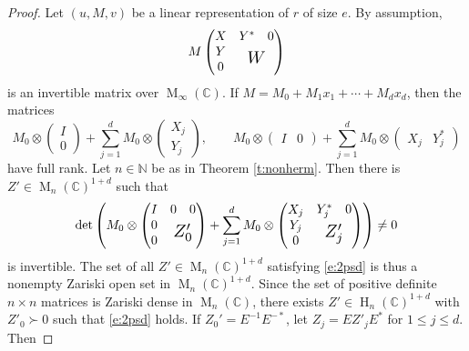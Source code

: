 \documentclass[12pt,a4paper]{amsart}
\DeclareMathOperator{\opm}{M}
\DeclareMathOperator{\oph}{H}
\newcommand{\N}{\mathbb{N}}
\newcommand{\C}{\mathbb{C}}
\newcommand*{\mathlarger}[1]{\scalebox{1.35}{$#1$}}
\newcommand*{\mat}[1]{\opm_{#1}(\C)}
\newcommand*{\her}[1]{\oph_{#1}(\C)}
\newcommand{\cfm}{\opm_\infty(\C)}
\theoremstyle{definition}
\theoremstyle{remark}
\numberwithin{equation}{section}
\begin{document}
\begin{proof}
Let $(u,M,v)$ be a linear representation of $r$ of size $e$.
By assumption,
$$M\begin{pmatrix}
X & \begin{matrix} Y^* & 0\end{matrix} \\
\begin{matrix} Y \\ 0\end{matrix} & \mathlarger{W}
\end{pmatrix} 
$$
is an invertible matrix over $\cfm$. If $M=M_0+M_1x_1+\cdots+M_dx_d$, then the matrices
$$M_0\otimes \begin{pmatrix}I \\ 0\end{pmatrix}+
\sum_{j=1}^d M_0\otimes \begin{pmatrix}X_j \\ Y_j\end{pmatrix},\qquad
M_0\otimes \begin{pmatrix}I & 0\end{pmatrix}+
\sum_{j=1}^d M_0\otimes \begin{pmatrix}X_j & Y_j^*\end{pmatrix}
$$
have full rank. Let $n\in\N$ be as in Theorem \ref{t:nonherm}. Then there is $Z'\in \mat{n}^{1+d}$ such that
\begin{equation}\label{e:2psd}
\det\left(M_0\otimes
\begin{pmatrix}
I & \begin{matrix} 0 & 0\end{matrix} \\
\begin{matrix} 0 \\ 0\end{matrix} & \mathlarger{Z'_0}
\end{pmatrix}+
\sum_{j=1}^d M_0\otimes 
\begin{pmatrix}
X_j & \begin{matrix} Y_j^* & 0\end{matrix} \\
\begin{matrix} Y_j \\ 0\end{matrix} & \mathlarger{Z'_j}
\end{pmatrix}
\right)\neq0
\end{equation}
is invertible. The set of all $Z'\in\mat{n}^{1+d}$ satisfying \eqref{e:2psd} is thus a nonempty Zariski open set in $\mat{n}^{1+d}$. Since the set of positive definite $n\times n$ matrices is Zariski dense in $\mat{n}$, there exists $Z'\in\her{n}^{1+d}$ with $Z'_0\succ0$ such that \eqref{e:2psd} holds. If $Z_0' = E^{-1}E^{-*}$, let $Z_j=EZ'_jE^*$ for $1\le j \le d$. Then

\end{proof}
\end{document}
